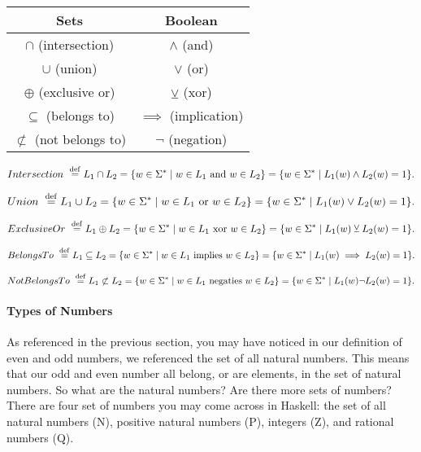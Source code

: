 \documentclass{article}
\begin{document}
\begin{center}
\begin{tabular}{|c | c|} 
 \hline
 Sets & Boolean \\ [0.5ex] 
 \hline
 $\cap$ (intersection) & $\wedge$ (and)  \\ 
 \hline
 $\cup$ (union) & $\lor$ (or)  \\
 \hline
 $\oplus$ (exclusive or) & $\veebar$ (xor)  \\
 \hline
 $\subseteq$ (belongs to) & $\implies$ (implication) \\
 \hline
 $\not\subset$ (not belongs to) & $\neg$ (negation) \\ [1ex] 
 \hline
\end{tabular}
\end{center}

 $$ Intersection \ \stackrel{\rm def}{=} L_1\cap L_2 = \{w\in\Sigma^\ast \mid w\in L_1 \textrm{ and } w\in L_2\}= \{w\in\Sigma^\ast \mid L_1(w) \wedge L_2(w) = 1\}.$$

 $$ Union \ \stackrel{\rm def}{=} L_1\cup L_2 = \{w\in\Sigma^\ast \mid w\in L_1 \textrm{ or } w\in L_2\}= \{w\in\Sigma^\ast \mid L_1(w) \lor L_2(w) = 1\}.$$

 $$ Exclusive Or \ \stackrel{\rm def}{=} L_1\oplus L_2 = \{w\in\Sigma^\ast \mid w\in L_1 \textrm{ xor } w\in L_2\}= \{w\in\Sigma^\ast \mid L_1(w) \veebar L_2(w) = 1\}.$$

 $$ Belongs To \ \stackrel{\rm def}{=} L_1\subseteq L_2 = \{w\in\Sigma^\ast \mid w\in L_1 \textrm{ implies } w\in L_2\}= \{w\in\Sigma^\ast \mid L_1(w) \implies L_2(w) = 1\}.$$

 $$Not Belongs To \ \stackrel{\rm def}{=} L_1\not\subset L_2 = \{w\in\Sigma^\ast \mid w\in L_1 \textrm{ negaties } w\in L_2\}= \{w\in\Sigma^\ast \mid L_1(w) \neg L_2(w) = 1\}.$$

\paragraph{Types of Numbers}

As referenced in the previous section, you may have noticed in our definition of even and odd numbers, we referenced the set of all natural numbers. This means that our odd and even number all belong, or are elements, in the set of natural numbers. So what are the natural numbers? Are there more sets of numbers? There are four set of numbers you may come across in Haskell: the set of all natural numbers (N), positive natural numbers (P), integers (Z), and rational numbers (Q).
\end{document}
